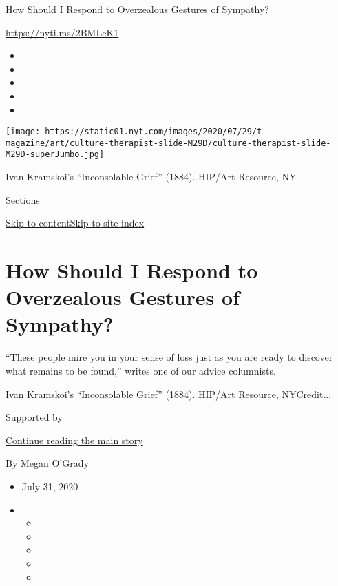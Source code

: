 How Should I Respond to Overzealous Gestures of Sympathy?

\url{https://nyti.ms/2BMLeK1}

\begin{itemize}
\item
\item
\item
\item
\item
\end{itemize}

\texttt{[image: https://static01.nyt.com/images/2020/07/29/t-magazine/art/culture-therapist-slide-M29D/culture-therapist-slide-M29D-superJumbo.jpg]}

Ivan Kramskoi's ``Inconsolable Grief'' (1884). HIP/Art Resource, NY

Sections

\protect\hyperlink{site-content}{Skip to
content}\protect\hyperlink{site-index}{Skip to site index}

\hypertarget{how-should-i-respond-to-overzealous-gestures-of-sympathy}{%
\section{How Should I Respond to Overzealous Gestures of
Sympathy?}\label{how-should-i-respond-to-overzealous-gestures-of-sympathy}}

``These people mire you in your sense of loss just as you are ready to
discover what remains to be found,'' writes one of our advice
columnists.

Ivan Kramskoi's ``Inconsolable Grief'' (1884). HIP/Art Resource,
NYCredit...

Supported by

\protect\hyperlink{after-sponsor}{Continue reading the main story}

By \href{https://www.nytimes.com/by/megan-o-grady}{Megan O'Grady}

\begin{itemize}
\item
  July 31, 2020
\item
  \begin{itemize}
  \item
  \item
  \item
  \item
  \item
  \end{itemize}
\end{itemize}

